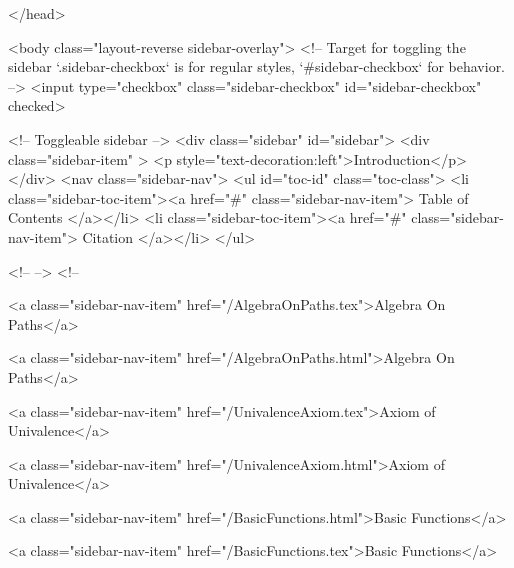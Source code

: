   
</head>




  <body class="layout-reverse sidebar-overlay">
    <!-- Target for toggling the sidebar `.sidebar-checkbox` is for regular
     styles, `#sidebar-checkbox` for behavior. -->
<input type="checkbox" class="sidebar-checkbox" id="sidebar-checkbox" checked>

<!-- Toggleable sidebar -->
<div class="sidebar" id="sidebar">
  <div class="sidebar-item" >
    <p style="text-decoration:left">Introduction</p>
  </div>
  <nav class="sidebar-nav">
    <ul id="toc-id" class="toc-class">
  <li class="sidebar-toc-item"><a href="#" class="sidebar-nav-item"> Table of Contents </a></li>
  <li class="sidebar-toc-item"><a href="#" class="sidebar-nav-item"> Citation </a></li>
</ul>


    <!--  -->
    <!-- 
      
    
      
    
      
    
      
        
      
    
      
        
          <a class="sidebar-nav-item" href="/AlgebraOnPaths.tex">Algebra On Paths</a>
        
      
    
      
        
          <a class="sidebar-nav-item" href="/AlgebraOnPaths.html">Algebra On Paths</a>
        
      
    
      
        
          <a class="sidebar-nav-item" href="/UnivalenceAxiom.tex">Axiom of Univalence</a>
        
      
    
      
        
          <a class="sidebar-nav-item" href="/UnivalenceAxiom.html">Axiom of Univalence</a>
        
      
    
      
        
          <a class="sidebar-nav-item" href="/BasicFunctions.html">Basic Functions</a>
        
      
    
      
        
          <a class="sidebar-nav-item" href="/BasicFunctions.tex">Basic Functions</a>
        
      
    
